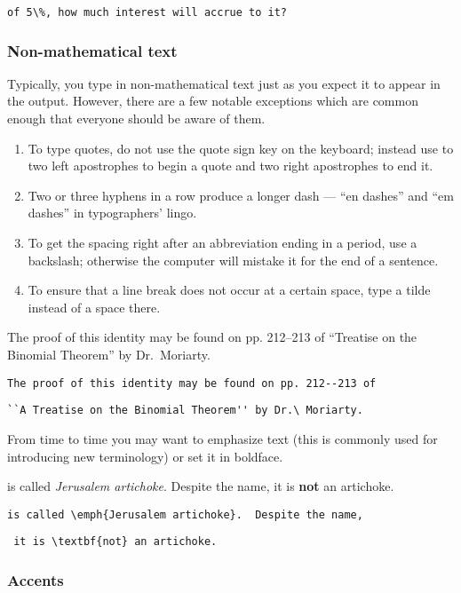 \verb=of 5\%, how much interest will accrue to it?=

\subsubsection{Non-mathematical text}

Typically, you type in non-mathematical text just as you expect it to appear in the output.  However, there are a few notable exceptions which are common enough that everyone should be aware of them.
\begin{enumerate}
\item To type quotes, do not use the quote sign key on the keyboard; instead use to two left apostrophes to begin a quote and two right apostrophes to end it.
\item Two or three hyphens in a row produce a longer dash --- ``en dashes'' and ``em dashes'' in typographers' lingo.
\item To get the spacing right after an abbreviation ending in a period, use a backslash; otherwise the computer will mistake it for the end of a sentence.
\item To ensure that a line break does not occur at a certain space, type a tilde instead of a space there.
\end{enumerate}

\medskip

The proof of this identity may be found on pp. 212--213 of ``Treatise on the Binomial Theorem'' by Dr.\ Moriarty. 

\smallskip

\verb=The proof of this identity may be found on pp. 212--213 of =

\verb=``A Treatise on the Binomial Theorem'' by Dr.\ Moriarty.=

\bigskip

From time to time you may want to emphasize text (this is commonly used for introducing new terminology) or set it in boldface.

\smallskip

is called \emph{Jerusalem artichoke}.  Despite the name, it is \textbf{not} an artichoke.

\smallskip

\verb"is called \emph{Jerusalem artichoke}.  Despite the name,"

\verb" it is \textbf{not} an artichoke."

\subsubsection{Accents}

